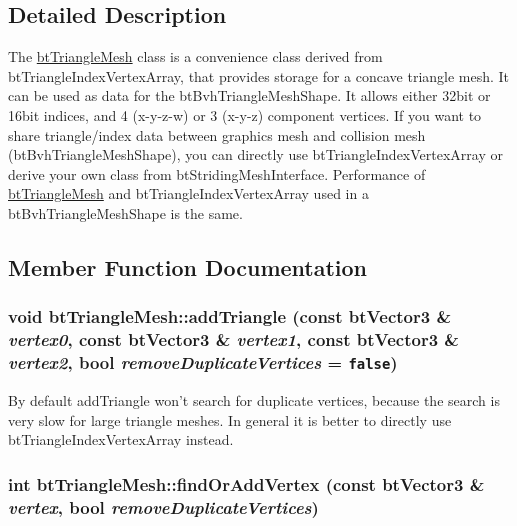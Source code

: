 \subsection{Detailed Description}
The \hyperlink{classbt_triangle_mesh}{btTriangleMesh} class is a convenience class derived from btTriangleIndexVertexArray, that provides storage for a concave triangle mesh. It can be used as data for the btBvhTriangleMeshShape. It allows either 32bit or 16bit indices, and 4 (x-y-z-w) or 3 (x-y-z) component vertices. If you want to share triangle/index data between graphics mesh and collision mesh (btBvhTriangleMeshShape), you can directly use btTriangleIndexVertexArray or derive your own class from btStridingMeshInterface. Performance of \hyperlink{classbt_triangle_mesh}{btTriangleMesh} and btTriangleIndexVertexArray used in a btBvhTriangleMeshShape is the same. 

\subsection{Member Function Documentation}
\hypertarget{classbt_triangle_mesh_28551d57ae59248a210163a504558583}{
\subsubsection[addTriangle]{\setlength{\rightskip}{0pt plus 5cm}void btTriangleMesh::addTriangle (const btVector3 \& {\em vertex0}, \/  const btVector3 \& {\em vertex1}, \/  const btVector3 \& {\em vertex2}, \/  bool {\em removeDuplicateVertices} = {\tt false})}}
\label{classbt_triangle_mesh_28551d57ae59248a210163a504558583}


By default addTriangle won't search for duplicate vertices, because the search is very slow for large triangle meshes. In general it is better to directly use btTriangleIndexVertexArray instead. \hypertarget{classbt_triangle_mesh_3b521a1faa5862a818d9f983230749a2}{
\subsubsection[findOrAddVertex]{\setlength{\rightskip}{0pt plus 5cm}int btTriangleMesh::findOrAddVertex (const btVector3 \& {\em vertex}, \/  bool {\em removeDuplicateVertices})}}
\label{classbt_triangle_mesh_3b521a1faa5862a818d9f983230749a2}


